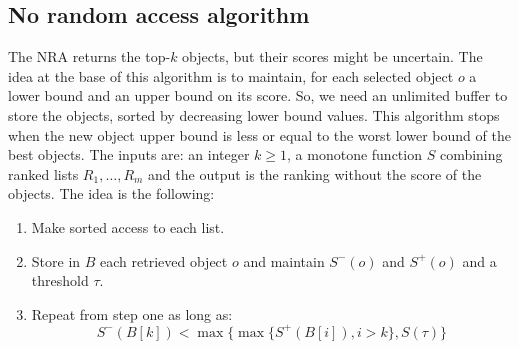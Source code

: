 \documentclass[12pt, a4paper]{report}
\newtheorem[style=M,bodystyle=\normalfont]{theorem}{Theorem}
\newtheorem[style=M,bodystyle=\normalfont]{corollary}{Corollary}
\newtheorem[style=M,bodystyle=\normalfont]{lemma}{Lemma}
\newtheorem[style=M,bodystyle=\normalfont]{definition}{Definition}
\begin{document}
    \subsection{No random access algorithm}
    The NRA returns the top-$k$ objects, but their scores might be uncertain. The idea at the base of this algorithm is to maintain, for each selected object
    $o$ a lower bound and an upper bound on its score. So, we need an unlimited buffer to 
    store the objects, sorted by decreasing lower bound values. This algorithm 
    stops when the new object upper bound is less or equal to the worst lower bound of the best objects. The inputs are: 
    an integer $k \geq 1$, a monotone function $S$ combining ranked lists $R_1, \dots, R_m$ and the output is the ranking
    without the score of the objects. The idea is the following: 
    \begin{enumerate}
        \item Make sorted access to each list. 
        \item Store in $B$ each retrieved object $o$ and maintain $S^{-}(o)$ and $S^{+}(o)$ and a threshold $\tau$. 
        \item Repeat from step one as long as:
            \[S^{-}(B[k]) < \max\{ \max\{S^{+}(B[i]), i > k\}, S(\tau) \}\]
    \end{enumerate}
\end{document}

